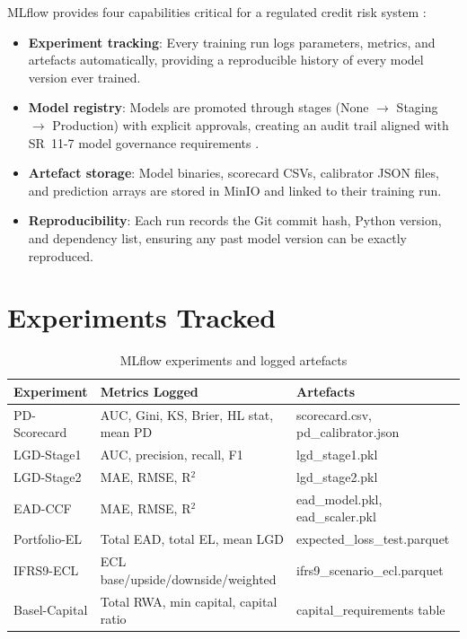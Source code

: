 \documentclass[12pt,a4paper]{report}
\begin{document}
MLflow provides four capabilities critical for a regulated credit risk system \cite{mlflow2026}:
\begin{itemize}
  \item \textbf{Experiment tracking}: Every training run logs parameters, metrics, and artefacts automatically, providing a reproducible history of every model version ever trained.
  \item \textbf{Model registry}: Models are promoted through stages (None $\to$ Staging $\to$ Production) with explicit approvals, creating an audit trail aligned with SR~11-7 model governance requirements \cite{sr117}.
  \item \textbf{Artefact storage}: Model binaries, scorecard CSVs, calibrator JSON files, and prediction arrays are stored in MinIO and linked to their training run.
  \item \textbf{Reproducibility}: Each run records the Git commit hash, Python version, and dependency list, ensuring any past model version can be exactly reproduced.
\end{itemize}

\section{Experiments Tracked}

\begin{table}[H]
\centering
\caption{MLflow experiments and logged artefacts}
\label{tab:mlflow}
\begin{tabular}{lll}
\toprule
\textbf{Experiment} & \textbf{Metrics Logged} & \textbf{Artefacts} \\
\midrule
PD-Scorecard & AUC, Gini, KS, Brier, HL stat, mean PD & scorecard.csv, pd\_calibrator.json \\
LGD-Stage1   & AUC, precision, recall, F1 & lgd\_stage1.pkl \\
LGD-Stage2   & MAE, RMSE, R$^2$ & lgd\_stage2.pkl \\
EAD-CCF      & MAE, RMSE, R$^2$ & ead\_model.pkl, ead\_scaler.pkl \\
Portfolio-EL & Total EAD, total EL, mean LGD & expected\_loss\_test.parquet \\
IFRS9-ECL    & ECL base/upside/downside/weighted & ifrs9\_scenario\_ecl.parquet \\
Basel-Capital& Total RWA, min capital, capital ratio & capital\_requirements table \\
\bottomrule
\end{tabular}
\end{table}
\end{document}
